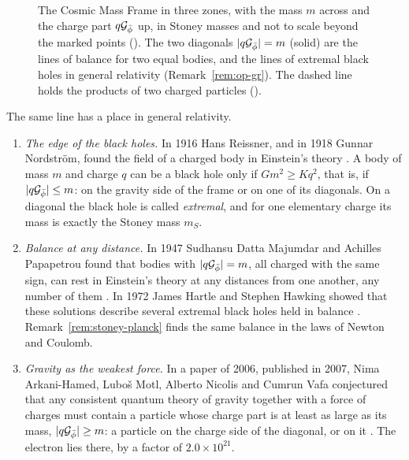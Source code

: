 \begin{figure}[tb]
\caption[The diagonal of the frame]{The Cosmic Mass Frame in three zones, with the mass $m$ across and the charge part $q\mathcal{G}_{\bar{\phi}}$ up, in Stoney masses and not to scale beyond the marked points (). The two diagonals $|q\mathcal{G}_{\bar{\phi}}| = m$ (solid) are the lines of balance for two equal bodies, and the lines of extremal black holes in general relativity (Remark~\ref{rem:op-gr}). The dashed line holds the products of two charged particles ().}
\label{fig:op-zones}
\end{figure}

The same line has a place in general relativity.

\begin{remark}\label{rem:op-gr}
\leavevmode
\begin{enumerate}
  \item \emph{The edge of the black holes.} In 1916 Hans Reissner, and in 1918 Gunnar Nordstr\"om, found the field of a charged body in Einstein's theory \citep{Reissner1916,Nordstrom1918}. A body of mass $m$ and charge $q$ can be a black hole only if $G m^2 \geq K q^2$, that is, if $|q\mathcal{G}_{\bar{\phi}}| \leq m$: on the gravity side of the frame or on one of its diagonals. On a diagonal the black hole is called \emph{extremal}, and for one elementary charge its mass is exactly the Stoney mass $m_S$.
  \item \emph{Balance at any distance.} In 1947 Sudhansu Datta Majumdar and Achilles Papapetrou found that bodies with $|q\mathcal{G}_{\bar{\phi}}| = m$, all charged with the same sign, can rest in Einstein's theory at any distances from one another, any number of them \citep{Majumdar1947,Papapetrou1947}. In 1972 James Hartle and Stephen Hawking showed that these solutions describe several extremal black holes held in balance \citep{HartleHawking1972}. Remark~\ref{rem:stoney-planck} finds the same balance in the laws of Newton and Coulomb.
  \item \emph{Gravity as the weakest force.} In a paper of 2006, published in 2007, Nima Arkani-Hamed, Lubo\v{s} Motl, Alberto Nicolis and Cumrun Vafa conjectured that any consistent quantum theory of gravity together with a force of charges must contain a particle whose charge part is at least as large as its mass, $|q\mathcal{G}_{\bar{\phi}}| \geq m$: a particle on the charge side of the diagonal, or on it \citep{ArkaniHamed2007}. The electron lies there, by a factor of $2.0 \times 10^{21}$.
\end{enumerate}
\end{remark}

